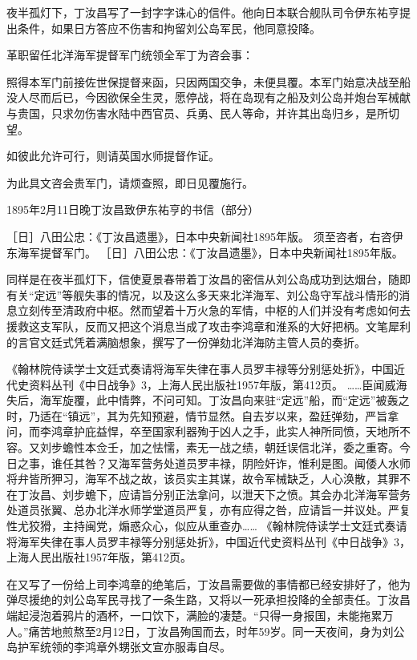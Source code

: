 \documentclass[12pt,UTF8]{ctexbook}
\begin{document}
夜半孤灯下，丁汝昌写了一封字字诛心的信件。他向日本联合舰队司令伊东祐亨提出条件，如果日方答应不伤害和拘留刘公岛军民，他同意投降。

革职留任北洋海军提督军门统领全军丁为咨会事：

照得本军门前接佐世保提督来函，只因两国交争，未便具覆。本军门始意决战至船没人尽而后已，今因欲保全生灵，愿停战，将在岛现有之船及刘公岛并炮台军械献与贵国，只求勿伤害水陆中西官员、兵勇、民人等命，并许其出岛归乡，是所切望。

如彼此允许可行，则请英国水师提督作证。

为此具文咨会贵军门，请烦查照，即日见覆施行。


1895年2月11日晚丁汝昌致伊东祐亨的书信（部分）

［日］八田公忠：《丁汝昌遗墨》，日本中央新闻社1895年版。
须至咨者，右咨伊东海军提督军门。 ［日］八田公忠：《丁汝昌遗墨》，日本中央新闻社1895年版。

同样是在夜半孤灯下，信使夏景春带着丁汝昌的密信从刘公岛成功到达烟台，随即有关“定远”等舰失事的情况，以及这么多天来北洋海军、刘公岛守军战斗情形的消息立刻传至清政府中枢。然而望着十万火急的军情，中枢的人们并没有考虑如何去援救这支军队，反而又把这个消息当成了攻击李鸿章和淮系的大好把柄。文笔犀利的言官文廷式凭着满脑想象，撰写了一份弹劾北洋海防主管人员的奏折。

《翰林院侍读学士文廷式奏请将海军失律在事人员罗丰禄等分别惩处折》，中国近代史资料丛刊《中日战争》3，上海人民出版社1957年版，第412页。
……臣闻威海失后，海军旋覆，此中情弊，不问可知。丁汝昌向来驻“定远”船，而“定远”被轰之时，乃适在“镇远”，其为先知预避，情节显然。自去岁以来，盈廷弹劾，严旨拿问，而李鸿章护庇益悍，卒至国家利器殉于凶人之手，此实人神所同愤，天地所不容。又刘步蟾性本佥壬，加之怯懦，素无一战之绩，朝廷误信北洋，委之重寄。今日之事，谁任其咎？又海军营务处道员罗丰禄，阴险奸诈，惟利是图。闻倭人水师将弁皆所狎习，海军不战之故，该员实主其谋，故令军械缺乏，人心涣散，其罪不在丁汝昌、刘步蟾下，应请旨分别正法拿问，以泄天下之愤。其会办北洋海军营务处道员张翼、总办北洋水师学堂道员严复，亦有应得之咎，应请旨一并议处。严复性尤狡猾，主持闽党，煽惑众心，似应从重查办…… 《翰林院侍读学士文廷式奏请将海军失律在事人员罗丰禄等分别惩处折》，中国近代史资料丛刊《中日战争》3，上海人民出版社1957年版，第412页。

在又写了一份给上司李鸿章的绝笔后，丁汝昌需要做的事情都已经安排好了，他为弹尽援绝的刘公岛军民寻找了一条生路，又将以一死承担投降的全部责任。丁汝昌端起浸泡着鸦片的酒杯，一口饮下，满脸的凄楚。“只得一身报国，未能拖累万人。”痛苦地煎熬至2月12日，丁汝昌殉国而去，时年59岁。同一天夜间，身为刘公岛护军统领的李鸿章外甥张文宣亦服毒自尽。
\end{document}
